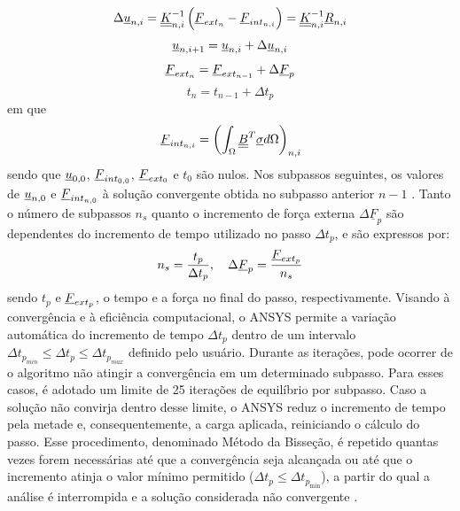 \begin{equation}
	\label{eq:NR1}
	\Delta \underline u_{n,i} = \underline{\underline K}_{n,i}^{-1}\left(\underline{F}_{ext_{n}} - \underline{F}_{int_{n,i}} \right) = \underline{\underline K}_{n,i}^{-1}\underline{R}_{n,i}
\end{equation}
\begin{equation}
	\label{eq:NR2}
	\underline u_{n,i+1} = \underline u_{n,i}+\Delta\underline u_{n,i}
\end{equation}
\begin{equation}
	\label{eq:NR3}
	\underline{F}_{ext_{n}} = \underline{F}_{ext_{n-1}} + \Delta \underline{F}_{p}
\end{equation}
\begin{equation}
	\label{eq:NR4}
	t_{n} = t_{n-1} + \Delta t_p
\end{equation}
em que
\begin{equation}
	\label{eq:NR5}
	\underline{F}_{int_{n,i}} = \left( \int_{\Omega} \underline{\underline B}^T \underline \sigma d\Omega \right)_{n,i}
\end{equation}
sendo que $\underline u_{0,0}$, $\underline{F}_{int_{0,0}}$, $\underline{F}_{ext_0}$ e $t_0$ são nulos. Nos subpassos seguintes, os valores de $\underline u_{n,0}$ e $\underline{F}_{int_{n,0}}$ à solução convergente obtida no subpasso anterior $n-1$ \cite{ANSYS2018}. Tanto o número de subpassos $n_s$ quanto o incremento de força externa $\Delta \underline{F}_p$ são dependentes do incremento de tempo utilizado no passo $\Delta t_p$, e são expressos por:
\begin{equation}
	\label{eq:NR6}
	n_s = \dfrac{t_p}{\Delta t_p},~~~ \Delta \underline{F}_{p} = \dfrac{\underline{F}_{ext_p}}{n_s}
\end{equation}
sendo $t_p$ e $\underline{F}_{ext_p}$, o tempo e a força no final do passo, respectivamente. Visando à convergência e à eficiência computacional, o ANSYS permite a variação automática do incremento de tempo $\Delta t_p$ dentro de um intervalo $\Delta t_{p_{min}} \leq \Delta t_p \leq \Delta t_{p_{max}}$ definido pelo usuário. Durante as iterações, pode ocorrer de o algoritmo não atingir a convergência em um determinado subpasso. Para esses casos, é adotado um limite de 25 iterações de equilíbrio por subpasso. Caso a solução não convirja dentro desse limite, o ANSYS reduz o incremento de tempo pela metade e, consequentemente, a carga aplicada, reiniciando o cálculo do passo. Esse procedimento, denominado Método da Bisseção, é repetido quantas vezes forem necessárias até que a convergência seja alcançada ou até que o incremento atinja o valor mínimo permitido ($\Delta t_p \leq \Delta t_{p_{\min}}$), a partir do qual a análise é interrompida e a solução considerada não convergente \cite{ANSYS2018}.

